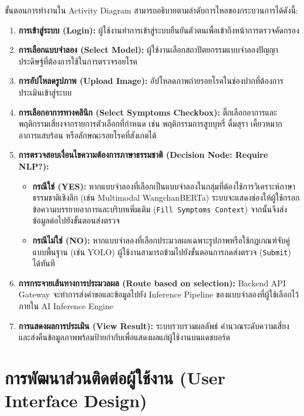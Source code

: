 ขั้นตอนการทำงานใน Activity Diagram สามารถอธิบายตามลำดับการไหลของกระบวนการได้ดังนี้:
\begin{enumerate}
    \item \textbf{การเข้าสู่ระบบ (Login):} ผู้ใช้งานทำการเข้าสู่ระบบยืนยันตัวตนเพื่อเข้าถึงหน้าการตรวจคัดกรอง
    \item \textbf{การเลือกแบบจำลอง (Select Model):} ผู้ใช้งานเลือกสถาปัตยกรรมแบบจำลองปัญญาประดิษฐ์ที่ต้องการใช้ในการตรวจรอยโรค
    \item \textbf{การอัปโหลดรูปภาพ (Upload Image):} อัปโหลดภาพถ่ายรอยโรคในช่องปากที่ต้องการประเมินเข้าสู่ระบบ
    \item \textbf{การเลือกอาการทางคลินิก (Select Symptoms Checkbox):} ติ๊กเลือกอาการและพฤติกรรมเสี่ยงจากรายการตัวเลือกที่กำหนด เช่น พฤติกรรมการสูบบุหรี่ ดื่มสุรา เคี้ยวหมาก อาการแสบร้อน หรือลักษณะรอยโรคที่สังเกตได้
    \item \textbf{การตรวจสอบเงื่อนไขความต้องการภาษาธรรมชาติ (Decision Node: Require NLP?):}
    \begin{itemize}
        \item \textbf{กรณีใช่ (YES):} หากแบบจำลองที่เลือกเป็นแบบจำลองในกลุ่มที่ต้องใช้การวิเคราะห์ภาษาธรรมชาติเชิงลึก (เช่น Multimodal WangchanBERTa) ระบบจะแสดงช่องให้ผู้ใช้กรอกข้อความบรรยายอาการและบริบทเพิ่มเติม (\texttt{Fill Symptoms Context}) จากนั้นจึงส่งข้อมูลต่อไปยังขั้นตอนส่งตรวจ
        \item \textbf{กรณีไม่ใช่ (NO):} หากแบบจำลองที่เลือกประมวลผลเฉพาะรูปภาพหรือใช้กฎเกณฑ์จับคู่แบบพื้นฐาน (เช่น YOLO) ผู้ใช้งานสามารถข้ามไปยังขั้นตอนการกดส่งตรวจ (\texttt{Submit}) ได้ทันที
    \end{itemize}
    \item \textbf{การกระจายเส้นทางการประมวลผล (Route based on selection):} Backend API Gateway จะทำการส่งคำขอและข้อมูลไปยัง Inference Pipeline ของแบบจำลองที่ผู้ใช้เลือกไว้ภายใน AI Inference Engine
    \item \textbf{การแสดงผลการประเมิน (View Result):} ระบบรวบรวมผลลัพธ์ คำนวณระดับความเสี่ยง และส่งคืนข้อมูลภาพพร้อมป้ายกำกับเพื่อแสดงผลแก่ผู้ใช้งานบนแดชบอร์ด
\end{enumerate}

\section{การพัฒนาส่วนติดต่อผู้ใช้งาน (User Interface Design)}
\label{sec:ui_design}

